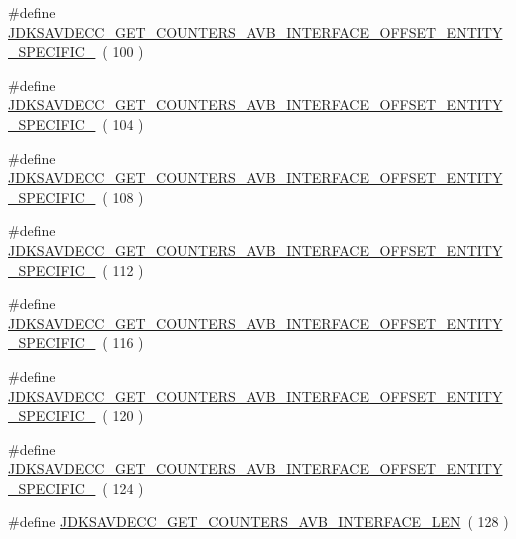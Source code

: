 \begin{DoxyCompactItemize}
\#define \hyperlink{group__get__counters__avb__interface_ga0d5e4603c5b3d9f475c236e7907c337a}{J\+D\+K\+S\+A\+V\+D\+E\+C\+C\+\_\+\+G\+E\+T\+\_\+\+C\+O\+U\+N\+T\+E\+R\+S\+\_\+\+A\+V\+B\+\_\+\+I\+N\+T\+E\+R\+F\+A\+C\+E\+\_\+\+O\+F\+F\+S\+E\+T\+\_\+\+E\+N\+T\+I\+T\+Y\+\_\+\+S\+P\+E\+C\+I\+F\+I\+C\+\_}~( 100 )
\item 
\#define \hyperlink{group__get__counters__avb__interface_ga8ab08179adeaf1bd57bb12bef1e5f8a6}{J\+D\+K\+S\+A\+V\+D\+E\+C\+C\+\_\+\+G\+E\+T\+\_\+\+C\+O\+U\+N\+T\+E\+R\+S\+\_\+\+A\+V\+B\+\_\+\+I\+N\+T\+E\+R\+F\+A\+C\+E\+\_\+\+O\+F\+F\+S\+E\+T\+\_\+\+E\+N\+T\+I\+T\+Y\+\_\+\+S\+P\+E\+C\+I\+F\+I\+C\+\_}~( 104 )
\item 
\#define \hyperlink{group__get__counters__avb__interface_gaa666d184a1d547a363e2fb958bc32ee3}{J\+D\+K\+S\+A\+V\+D\+E\+C\+C\+\_\+\+G\+E\+T\+\_\+\+C\+O\+U\+N\+T\+E\+R\+S\+\_\+\+A\+V\+B\+\_\+\+I\+N\+T\+E\+R\+F\+A\+C\+E\+\_\+\+O\+F\+F\+S\+E\+T\+\_\+\+E\+N\+T\+I\+T\+Y\+\_\+\+S\+P\+E\+C\+I\+F\+I\+C\+\_}~( 108 )
\item 
\#define \hyperlink{group__get__counters__avb__interface_ga879f57e090d8324be526615d81c29de0}{J\+D\+K\+S\+A\+V\+D\+E\+C\+C\+\_\+\+G\+E\+T\+\_\+\+C\+O\+U\+N\+T\+E\+R\+S\+\_\+\+A\+V\+B\+\_\+\+I\+N\+T\+E\+R\+F\+A\+C\+E\+\_\+\+O\+F\+F\+S\+E\+T\+\_\+\+E\+N\+T\+I\+T\+Y\+\_\+\+S\+P\+E\+C\+I\+F\+I\+C\+\_}~( 112 )
\item 
\#define \hyperlink{group__get__counters__avb__interface_ga97a9a1cc9d99a24b827adde38ea77bf0}{J\+D\+K\+S\+A\+V\+D\+E\+C\+C\+\_\+\+G\+E\+T\+\_\+\+C\+O\+U\+N\+T\+E\+R\+S\+\_\+\+A\+V\+B\+\_\+\+I\+N\+T\+E\+R\+F\+A\+C\+E\+\_\+\+O\+F\+F\+S\+E\+T\+\_\+\+E\+N\+T\+I\+T\+Y\+\_\+\+S\+P\+E\+C\+I\+F\+I\+C\+\_}~( 116 )
\item 
\#define \hyperlink{group__get__counters__avb__interface_gaf9c93e056dfe0cf761893991eb8e576a}{J\+D\+K\+S\+A\+V\+D\+E\+C\+C\+\_\+\+G\+E\+T\+\_\+\+C\+O\+U\+N\+T\+E\+R\+S\+\_\+\+A\+V\+B\+\_\+\+I\+N\+T\+E\+R\+F\+A\+C\+E\+\_\+\+O\+F\+F\+S\+E\+T\+\_\+\+E\+N\+T\+I\+T\+Y\+\_\+\+S\+P\+E\+C\+I\+F\+I\+C\+\_}~( 120 )
\item 
\#define \hyperlink{group__get__counters__avb__interface_ga52274e755a7eb4d7d8a3c3566e38fca3}{J\+D\+K\+S\+A\+V\+D\+E\+C\+C\+\_\+\+G\+E\+T\+\_\+\+C\+O\+U\+N\+T\+E\+R\+S\+\_\+\+A\+V\+B\+\_\+\+I\+N\+T\+E\+R\+F\+A\+C\+E\+\_\+\+O\+F\+F\+S\+E\+T\+\_\+\+E\+N\+T\+I\+T\+Y\+\_\+\+S\+P\+E\+C\+I\+F\+I\+C\+\_}~( 124 )
\item 
\#define \hyperlink{group__get__counters__avb__interface_ga120acd2cec9b7e2d5233ac676617098a}{J\+D\+K\+S\+A\+V\+D\+E\+C\+C\+\_\+\+G\+E\+T\+\_\+\+C\+O\+U\+N\+T\+E\+R\+S\+\_\+\+A\+V\+B\+\_\+\+I\+N\+T\+E\+R\+F\+A\+C\+E\+\_\+\+L\+EN}~( 128 )
\end{DoxyCompactItemize}


